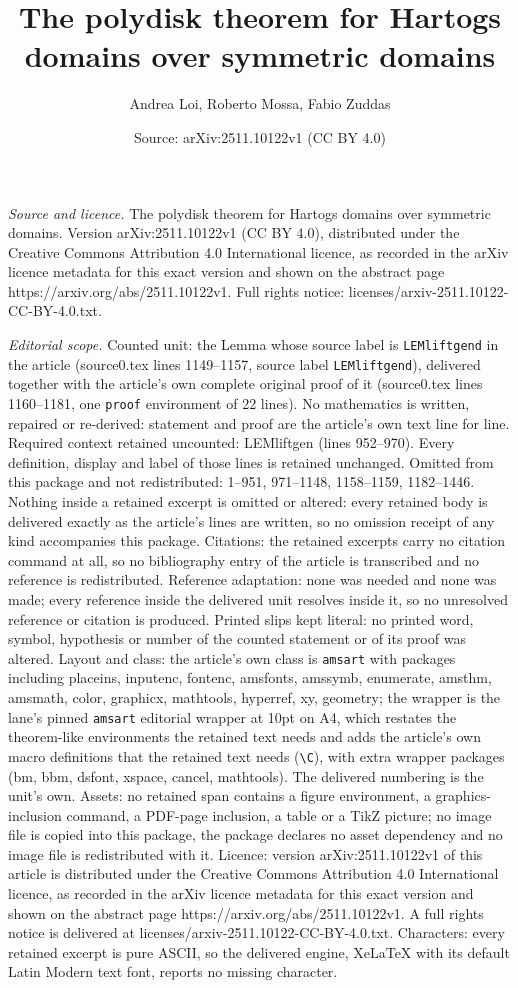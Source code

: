 \documentclass[10pt,a4paper]{amsart}
\title[The polydisk theorem for Hartogs domains over symmetric doma]{The polydisk theorem for Hartogs domains over symmetric domains}
\author{Andrea Loi, Roberto Mossa, Fabio Zuddas}
\date{Source: arXiv:2511.10122v1 (CC BY 4.0)}
\begin{document}
\maketitle

\noindent\emph{Source and licence.} The polydisk theorem for Hartogs domains over symmetric domains. Version arXiv:2511.10122v1 (CC BY 4.0), distributed under the Creative Commons Attribution 4.0 International licence, as recorded in the arXiv licence metadata for this exact version and shown on the abstract page https://arxiv.org/abs/2511.10122v1. Full rights notice: licenses/arxiv-2511.10122-CC-BY-4.0.txt.\par\smallskip

\noindent\textit{Editorial scope.} Counted unit: the Lemma whose source label is \texttt{LEMliftgend} in the article (source0.tex lines 1149--1157, source label \texttt{LEMliftgend}), delivered together with the article's own complete original proof of it (source0.tex lines 1160--1181, one \texttt{proof} environment of 22 lines). No mathematics is written, repaired or re-derived: statement and proof are the article's own text line for line. Required context retained uncounted: LEMliftgen (lines 952--970). Every definition, display and label of those lines is retained unchanged. Omitted from this package and not redistributed: 1--951, 971--1148, 1158--1159, 1182--1446. Nothing inside a retained excerpt is omitted or altered: every retained body is delivered exactly as the article's lines are written, so no omission receipt of any kind accompanies this package. Citations: the retained excerpts carry no citation command at all, so no bibliography entry of the article is transcribed and no reference is redistributed. Reference adaptation: none was needed and none was made; every reference inside the delivered unit resolves inside it, so no unresolved reference or citation is produced. Printed slips kept literal: no printed word, symbol, hypothesis or number of the counted statement or of its proof was altered. Layout and class: the article's own class is \texttt{amsart} with packages including placeins, inputenc, fontenc, amsfonts, amssymb, enumerate, amsthm, amsmath, color, graphicx, mathtools, hyperref, xy, geometry; the wrapper is the lane's pinned \texttt{amsart} editorial wrapper at 10pt on A4, which restates the theorem-like environments the retained text needs and adds the article's own macro definitions that the retained text needs (\texttt{\textbackslash C}), with extra wrapper packages (bm, bbm, dsfont, xspace, cancel, mathtools). The delivered numbering is the unit's own. Assets: no retained span contains a figure environment, a graphics-inclusion command, a PDF-page inclusion, a table or a TikZ picture; no image file is copied into this package, the package declares no asset dependency and no image file is redistributed with it. Licence: version arXiv:2511.10122v1 of this article is distributed under the Creative Commons Attribution 4.0 International licence, as recorded in the arXiv licence metadata for this exact version and shown on the abstract page https://arxiv.org/abs/2511.10122v1. A full rights notice is delivered at licenses/arxiv-2511.10122-CC-BY-4.0.txt. Characters: every retained excerpt is pure ASCII, so the delivered engine, XeLaTeX with its default Latin Modern text font, reports no missing character.
\end{document}
